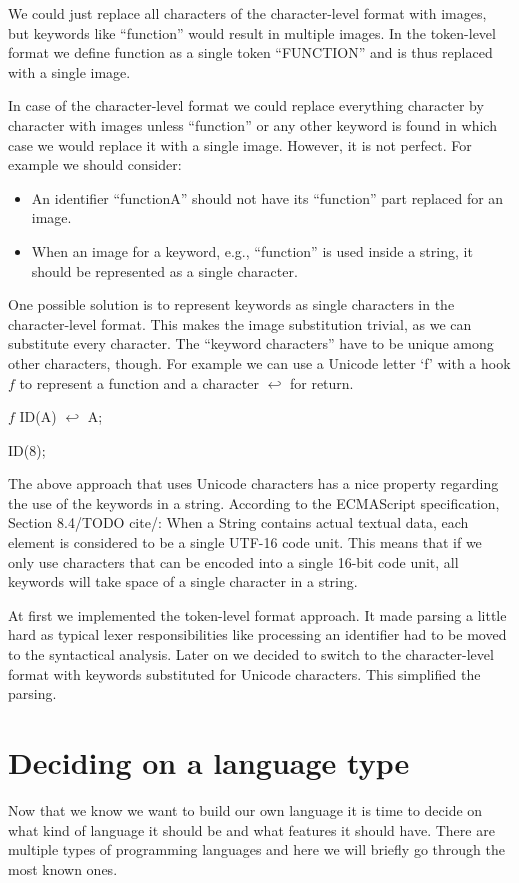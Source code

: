 We could just replace all characters of the character-level format with images, but keywords like ``function'' would result in multiple images. In the token-level
format we define function as a single token ``FUNCTION'' and is thus replaced with a single image.

In case of the character-level format we could replace everything character by character with images unless ``function'' or any other keyword is found in which
case we would replace it with a single image. However, it is not perfect. For example we should consider:
\begin{itemize}
    \item An identifier ``functionA'' should not have its ``function'' part replaced for an image.
    \item When an image for a keyword, e.g., ``function'' is used inside a string, it should be represented as a single character.
\end{itemize}

One possible solution is to represent keywords as single characters in the character-level format. This makes the image substitution trivial, as we can substitute
every character. The ``keyword characters'' have to be unique among other characters, though. For example we can use a Unicode letter `f' with a hook $f$
to represent a function and a character $\hookleftarrow$ for return.
\begin{code}
$f$ ID(A) {
    $\hookleftarrow$ A;
}

ID(8);
\end{code}

The above approach that uses Unicode characters has a nice property regarding the use of the keywords in a string. According to the ECMAScript specification,
Section 8.4/TODO cite/: When a String contains actual textual data, each element is considered to be a single UTF-16 code unit. This means that if we
only use characters that can be encoded into a single 16-bit code unit, all keywords will take space of a single character in a string.

At first we implemented the token-level format approach. It made parsing a little hard as typical lexer responsibilities like processing an identifier
had to be moved to the syntactical analysis. Later on we decided to switch to the character-level format with keywords substituted for Unicode characters. This
simplified the parsing.

\section{Deciding on a language type}
Now that we know we want to build our own language it is time to decide on what kind of language it should be and what features it should have. There are
multiple types of programming languages and here we will briefly go through the most known ones.

